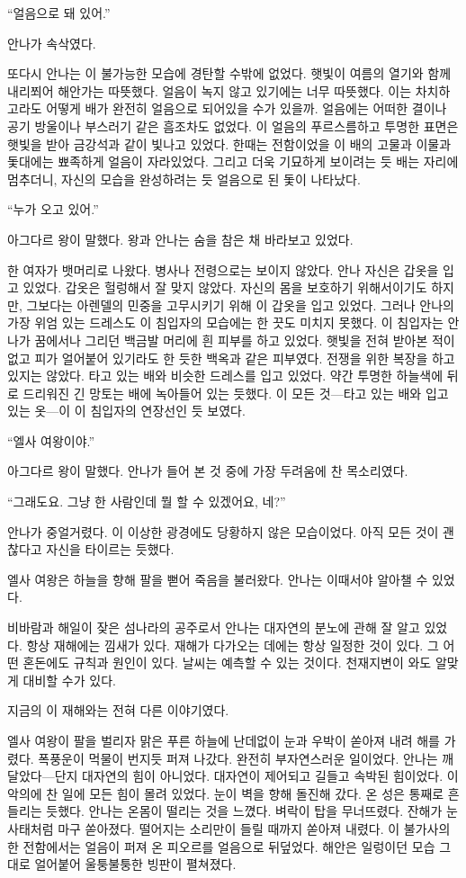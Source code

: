 ``얼음으로 돼 있어.''

안나가 속삭였다.

또다시 안나는 이 불가능한 모습에 경탄할 수밖에 없었다. 햇빛이 여름의 열기와 함께 내리쬐어 해안가는 따뜻했다. 얼음이 녹지 않고 있기에는 너무 따뜻했다. 이는 차치하고라도 어떻게 배가 완전히 얼음으로 되어있을 수가 있을까. 얼음에는 어떠한 결이나 공기 방울이나 부스러기 같은 흠조차도 없었다. 이 얼음의 푸르스름하고 투명한 표면은 햇빛을 받아 금강석과 같이 빛나고 있었다. 한때는 전함이었을 이 배의 고물과 이물과 돛대에는 뾰족하게 얼음이 자라있었다. 그리고 더욱 기묘하게 보이려는 듯 배는 자리에 멈추더니, 자신의 모습을 완성하려는 듯 얼음으로 된 돛이 나타났다.

``누가 오고 있어.''

아그다르 왕이 말했다. 왕과 안나는 숨을 참은 채 바라보고 있었다.

한 여자가 뱃머리로 나왔다. 병사나 전령으로는 보이지 않았다. 안나 자신은 갑옷을 입고 있었다. 갑옷은 헐렁해서 잘 맞지 않았다. 자신의 몸을 보호하기 위해서이기도 하지만, 그보다는 아렌델의 민중을 고무시키기 위해 이 갑옷을 입고 있었다. 그러나 안나의 가장 위엄 있는 드레스도 이 침입자의 모습에는 한 끗도 미치지 못했다. 이 침입자는 안나가 꿈에서나 그리던 백금발 머리에 흰 피부를 하고 있었다. 햇빛을 전혀 받아본 적이 없고 피가 얼어붙어 있기라도 한 듯한 백옥과 같은 피부였다. 전쟁을 위한 복장을 하고 있지는 않았다. 타고 있는 배와 비슷한 드레스를 입고 있었다. 약간 투명한 하늘색에 뒤로 드리워진 긴 망토는 배에 녹아들어 있는 듯했다. 이 모든 것—타고 있는 배와 입고 있는 옷—이 이 침입자의 연장선인 듯 보였다.

``엘사 여왕이야.''

아그다르 왕이 말했다. 안나가 들어 본 것 중에 가장 두려움에 찬 목소리였다.

``그래도요. 그냥 한 사람인데 뭘 할 수 있겠어요, 네?''

안나가 중얼거렸다. 이 이상한 광경에도 당황하지 않은 모습이었다. 아직 모든 것이 괜찮다고 자신을 타이르는 듯했다.

엘사 여왕은 하늘을 향해 팔을 뻗어 죽음을 불러왔다. 안나는 이때서야 알아챌 수 있었다.

비바람과 해일이 잦은 섬나라의 공주로서 안나는 대자연의 분노에 관해 잘 알고 있었다. 항상 재해에는 낌새가 있다. 재해가 다가오는 데에는 항상 일정한 것이 있다. 그 어떤 혼돈에도 규칙과 원인이 있다. 날씨는 예측할 수 있는 것이다. 천재지변이 와도 알맞게 대비할 수가 있다.

지금의 이 재해와는 전혀 다른 이야기였다.

엘사 여왕이 팔을 벌리자 맑은 푸른 하늘에 난데없이 눈과 우박이 쏟아져 내려 해를 가렸다. 폭풍운이 먹물이 번지듯 퍼져 나갔다. 완전히 부자연스러운 일이었다. 안나는 깨달았다—단지 대자연의 힘이 아니었다. 대자연이 제어되고 길들고 속박된 힘이었다. 이 악의에 찬 일에 모든 힘이 몰려 있었다. 눈이 벽을 향해 돌진해 갔다. 온 성은 통째로 흔들리는 듯했다. 안나는 온몸이 떨리는 것을 느꼈다. 벼락이 탑을 무너뜨렸다. 잔해가 눈사태처럼 마구 쏟아졌다. 떨어지는 소리만이 들릴 때까지 쏟아져 내렸다. 이 불가사의한 전함에서는 얼음이 퍼져 온 피오르를 얼음으로 뒤덮었다. 해안은 일렁이던 모습 그대로 얼어붙어 울퉁불퉁한 빙판이 펼쳐졌다.

